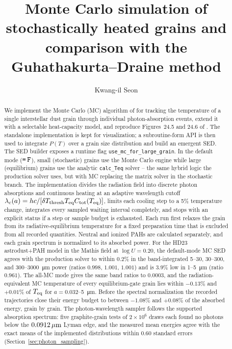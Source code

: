 \documentclass{my_memo}
\title{Monte Carlo simulation of stochastically heated grains
       and comparison with the Guhathakurta--Draine method}
\author{Kwang-il Seon}
\date{\docmoddate}
\newcommand{\Ctot}{C_{\rm tot}}
\newcommand{\Teq}{T_{\rm eq}}
\newcommand{\umc}{\,\mu{\rm m}}
\begin{document}
\maketitle

\begin{abstract}
We implement the Monte Carlo (MC) algorithm of
\citet{DraineAnderson1985} for tracking the temperature of a single
interstellar dust grain through individual photon-absorption events,
extend it with a selectable heat-capacity model, and reproduce
Figures~24.5 and 24.6 of \citet{DrainePIIM2011}.  The standalone
implementation is kept for visualization; a subroutine-form API is
then used to integrate $P(T)$ over a grain size distribution and
build an emergent SED.  The SED builder exposes a runtime flag
\texttt{use\_mc\_for\_large\_grain}.  In the default mode
($\texttt{=\,F}$), small (stochastic) grains use the Monte Carlo
engine while large (equilibrium) grains use the analytic
\texttt{calc\_Teq} solver -- the same hybrid logic the production
solver uses, but with MC replacing the
\citet{GuhathakurtaDraine1989} matrix solver in the stochastic
branch.  The implementation divides the radiation field into discrete
photon absorptions and continuous heating at an adaptive wavelength
cutoff $\lambda_c(a)=hc/[\delta T_{\rm thresh}\Teq\Ctot(\Teq)]$, limits
each cooling step to a 5\% temperature change, integrates every sampled
waiting interval completely, and stops with an explicit status if a
step or sample budget is exhausted. Each run first relaxes the grain
from its radiative-equilibrium temperature for a fixed preparation time
that is excluded from all recorded quantities. Neutral and ionized PAHs
are calculated separately, and each grain spectrum is normalized to its
absorbed power.  For the HD23 astrodust+PAH model in the Mathis field
at $\log U=0.20$, the default-mode MC SED agrees with the production
solver to within $0.2\%$ in the band-integrated 5--30, 30--300, and
300--\SI{3000}{\micro\meter} power (ratios $0.998$, $1.001$, $1.001$)
and is $3.9\%$ low in 1--\SI{5}{\micro\meter} (ratio $0.961$). The
all-MC mode gives the same band ratios to $0.0003$, and the
radiation-equivalent MC temperature of every equilibrium-gate grain
lies within $-0.13\%$ and $+0.01\%$ of $\Teq$ for
$a=0.032$--\SI{5}{\micro\meter}.  Before the spectral normalization the
recorded trajectories close their energy budget to between $-1.08\%$
and $+0.08\%$ of the absorbed energy, grain by grain. The
photon-wavelength sampler follows the supported absorption spectrum:
five graphite-grain tests of $2\times10^6$ draws each found no photons
below the $0.0912\umc$ Lyman edge, and the measured mean energies
agree with the exact means of the implemented distributions within
0.60 standard errors (Section~\ref{sec:photon_sampling}).
\end{abstract}
\end{document}
